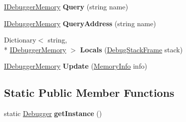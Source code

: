 \begin{DoxyCompactItemize}
\item 
\hypertarget{class_watcher_1_1_debugger_1_1_debugger_a42c8266009943fef00d9a575c0d61d94}{\hyperlink{interfacelib_utilities_1_1_i_debugger_memory}{I\+Debugger\+Memory} {\bfseries Query} (string name)}\label{class_watcher_1_1_debugger_1_1_debugger_a42c8266009943fef00d9a575c0d61d94}

\item 
\hypertarget{class_watcher_1_1_debugger_1_1_debugger_aceff318ccc7e788d7c144b132d9f5bd2}{\hyperlink{interfacelib_utilities_1_1_i_debugger_memory}{I\+Debugger\+Memory} {\bfseries Query\+Address} (string name)}\label{class_watcher_1_1_debugger_1_1_debugger_aceff318ccc7e788d7c144b132d9f5bd2}

\item 
\hypertarget{class_watcher_1_1_debugger_1_1_debugger_afca4dfee6516cc667d0a7cca7070fc44}{Dictionary$<$ string, \\*
\hyperlink{interfacelib_utilities_1_1_i_debugger_memory}{I\+Debugger\+Memory} $>$ {\bfseries Locals} (\hyperlink{classlib_wather_debugger_1_1_stack_1_1_debug_stack_frame}{Debug\+Stack\+Frame} stack)}\label{class_watcher_1_1_debugger_1_1_debugger_afca4dfee6516cc667d0a7cca7070fc44}

\item 
\hypertarget{class_watcher_1_1_debugger_1_1_debugger_a12d82d19f6f1795a9f5b4aa46867463c}{\hyperlink{interfacelib_utilities_1_1_i_debugger_memory}{I\+Debugger\+Memory} {\bfseries Update} (\hyperlink{classlib_wather_debugger_1_1_memory_1_1_memory_info}{Memory\+Info} info)}\label{class_watcher_1_1_debugger_1_1_debugger_a12d82d19f6f1795a9f5b4aa46867463c}

\end{DoxyCompactItemize}
\subsection*{Static Public Member Functions}
\begin{DoxyCompactItemize}
\item 
\hypertarget{class_watcher_1_1_debugger_1_1_debugger_a4565b127fc16eb3023c1465471c46886}{static \hyperlink{class_watcher_1_1_debugger_1_1_debugger}{Debugger} {\bfseries get\+Instance} ()}\label{class_watcher_1_1_debugger_1_1_debugger_a4565b127fc16eb3023c1465471c46886}

\end{DoxyCompactItemize}
